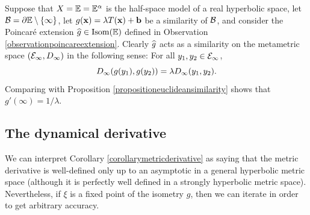 \begin{example}
\label{examplegprimeinfty}
Suppose that $X = \E = \E^\alpha$ is the half-space model of a real hyperbolic space, let $\BB = \del\E\butnot\{\infty\}$, let $g(\mathbf x) = \lambda T(\mathbf x) + \mathbf b$ be a similarity of $\mathcal B$, and consider the Poincar\'e extension $\what g\in\Isom(\E)$ defined in Observation \ref{observationpoincareextension}. Clearly $\widehat g$ acts as a similarity on the metametric space $(\mathcal E_\infty,D_\infty)$ in the following sense: For all $y_1,y_2\in \mathcal E_\infty$,
\[
D_\infty(g(y_1),g(y_2)) = \lambda D_\infty(y_1,y_2).
\]
Comparing with Proposition \ref{propositioneuclideansimilarity} shows that $g'(\infty) = 1/\lambda$.
\end{example}




\subsection{The dynamical derivative} \label{subsubsectiondynamicalderivative}
We can interpret Corollary \ref{corollarymetricderivative} as saying that the metric derivative is well-defined only up to an asymptotic in a general hyperbolic metric space (although it is perfectly well defined in a strongly hyperbolic metric space). Nevertheless, if $\xi$ is a fixed point of the isometry $g$, then we can iterate in order to get arbitrary accuracy.

